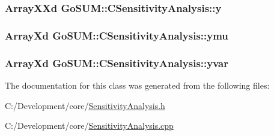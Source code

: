 \hypertarget{class_go_s_u_m_1_1_c_sensitivity_analysis_a171637b92e5aea9ed4ef91b6d9a071fc}{
\subsubsection[{y}]{\setlength{\rightskip}{0pt plus 5cm}Array\-X\-Xd Go\-S\-U\-M\-::\-C\-Sensitivity\-Analysis\-::y\hspace{0.3cm}{\ttfamily [private]}}}\label{class_go_s_u_m_1_1_c_sensitivity_analysis_a171637b92e5aea9ed4ef91b6d9a071fc}
\hypertarget{class_go_s_u_m_1_1_c_sensitivity_analysis_a51c232e563e72f692ca0888aa70a1b16}{
\subsubsection[{ymu}]{\setlength{\rightskip}{0pt plus 5cm}Array\-Xd Go\-S\-U\-M\-::\-C\-Sensitivity\-Analysis\-::ymu\hspace{0.3cm}{\ttfamily [private]}}}\label{class_go_s_u_m_1_1_c_sensitivity_analysis_a51c232e563e72f692ca0888aa70a1b16}
\hypertarget{class_go_s_u_m_1_1_c_sensitivity_analysis_a6312834689d3d295a7819352140dcc72}{
\subsubsection[{yvar}]{\setlength{\rightskip}{0pt plus 5cm}Array\-Xd Go\-S\-U\-M\-::\-C\-Sensitivity\-Analysis\-::yvar\hspace{0.3cm}{\ttfamily [private]}}}\label{class_go_s_u_m_1_1_c_sensitivity_analysis_a6312834689d3d295a7819352140dcc72}


The documentation for this class was generated from the following files\-:\begin{DoxyCompactItemize}
\item 
C\-:/\-Development/core/\hyperlink{_sensitivity_analysis_8h}{Sensitivity\-Analysis.\-h}\item 
C\-:/\-Development/core/\hyperlink{_sensitivity_analysis_8cpp}{Sensitivity\-Analysis.\-cpp}\end{DoxyCompactItemize}
